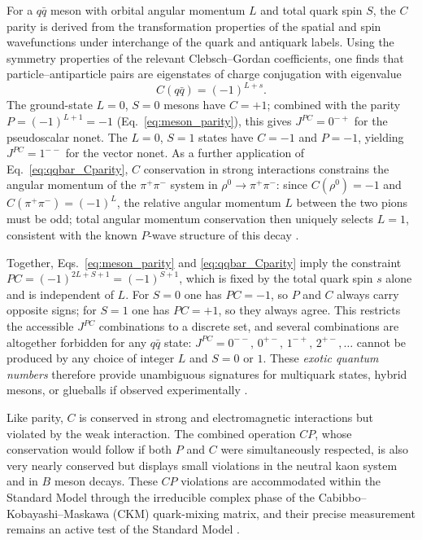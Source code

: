 For a $q\bar{q}$ meson with orbital angular momentum $L$ and total quark spin
$S$, the $C$ parity is derived from the transformation properties of the spatial and
spin wavefunctions under interchange of the quark and antiquark labels. Using the
symmetry properties of the relevant Clebsch--Gordan coefficients, one finds that
particle--antiparticle pairs are eigenstates of charge conjugation with eigenvalue
\begin{equation}
    C(q\bar{q}) = (-1)^{L+s}.
    \label{eq:qqbar_Cparity}
\end{equation}
The ground-state $L = 0$, $S = 0$ mesons have $C = +1$; combined with the
parity $P = (-1)^{L+1} = -1$ (Eq.~\eqref{eq:meson_parity}), this gives
$J^{PC} = 0^{-+}$ for the pseudoscalar nonet. The $L = 0$, $S = 1$ states have
$C = -1$ and $P = -1$, yielding $J^{PC} = 1^{--}$ for the vector nonet. As a
further application of Eq.~\eqref{eq:qqbar_Cparity}, $C$ conservation in strong
interactions constrains the angular momentum of the $\pi^+\pi^-$ system in
$\rho^0 \to \pi^+\pi^-$: since $C(\rho^0) = -1$ and $C(\pi^+\pi^-)=(-1)^L$,
the relative angular momentum $L$ between the two pions must be odd; total
angular momentum conservation then uniquely selects $L = 1$, consistent
with the known $P$-wave structure of this decay \cite[Ch.~3]{Amsler2018}.
 
Together, Eqs.~\eqref{eq:meson_parity} and \eqref{eq:qqbar_Cparity} imply the
constraint $PC = (-1)^{2L + S + 1} = (-1)^{S+1}$, which is fixed by the
total quark spin $s$ alone and is independent of $L$. For $S = 0$ one has
$PC = -1$, so $P$ and $C$ always carry opposite signs; for $S = 1$ one has
$PC = +1$, so they always agree. This restricts the accessible $J^{PC}$ combinations
to a discrete set, and several combinations are altogether forbidden for any
$q\bar{q}$ state: $J^{PC} = 0^{--},\,0^{+-},\,1^{-+},\,2^{+-},\ldots$ cannot be
produced by any choice of integer $L$ and $S = 0$ or $1$. These
\emph{exotic quantum numbers} therefore provide unambiguous signatures for
multiquark states, hybrid mesons, or glueballs if observed experimentally
\cite[Ch.~4]{Amsler2018}.
 
Like parity, $C$ is conserved in strong and electromagnetic interactions but
violated by the weak interaction. The combined operation $CP$, whose conservation
would follow if both $P$ and $C$ were simultaneously respected, is also very nearly
conserved but displays small violations in the neutral kaon system and in $B$ meson
decays. These $CP$ violations are accommodated within the Standard Model through
the irreducible complex phase of the Cabibbo--Kobayashi--Maskawa (CKM)
quark-mixing matrix, and their precise measurement remains an active test of the
Standard Model \cite[Ch.~1]{Amsler2018}.
 
